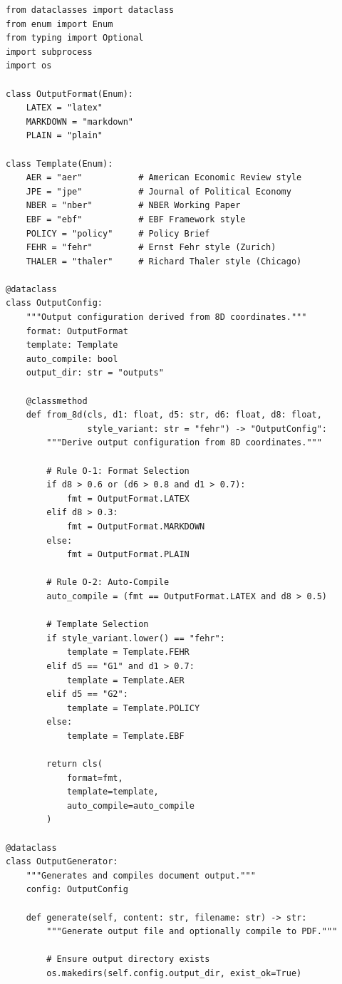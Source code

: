 \begin{verbatim}
from dataclasses import dataclass
from enum import Enum
from typing import Optional
import subprocess
import os

class OutputFormat(Enum):
    LATEX = "latex"
    MARKDOWN = "markdown"
    PLAIN = "plain"

class Template(Enum):
    AER = "aer"           # American Economic Review style
    JPE = "jpe"           # Journal of Political Economy
    NBER = "nber"         # NBER Working Paper
    EBF = "ebf"           # EBF Framework style
    POLICY = "policy"     # Policy Brief
    FEHR = "fehr"         # Ernst Fehr style (Zurich)
    THALER = "thaler"     # Richard Thaler style (Chicago)

@dataclass
class OutputConfig:
    """Output configuration derived from 8D coordinates."""
    format: OutputFormat
    template: Template
    auto_compile: bool
    output_dir: str = "outputs"

    @classmethod
    def from_8d(cls, d1: float, d5: str, d6: float, d8: float,
                style_variant: str = "fehr") -> "OutputConfig":
        """Derive output configuration from 8D coordinates."""

        # Rule O-1: Format Selection
        if d8 > 0.6 or (d6 > 0.8 and d1 > 0.7):
            fmt = OutputFormat.LATEX
        elif d8 > 0.3:
            fmt = OutputFormat.MARKDOWN
        else:
            fmt = OutputFormat.PLAIN

        # Rule O-2: Auto-Compile
        auto_compile = (fmt == OutputFormat.LATEX and d8 > 0.5)

        # Template Selection
        if style_variant.lower() == "fehr":
            template = Template.FEHR
        elif d5 == "G1" and d1 > 0.7:
            template = Template.AER
        elif d5 == "G2":
            template = Template.POLICY
        else:
            template = Template.EBF

        return cls(
            format=fmt,
            template=template,
            auto_compile=auto_compile
        )

@dataclass
class OutputGenerator:
    """Generates and compiles document output."""
    config: OutputConfig

    def generate(self, content: str, filename: str) -> str:
        """Generate output file and optionally compile to PDF."""

        # Ensure output directory exists
        os.makedirs(self.config.output_dir, exist_ok=True)


\end{verbatim}
